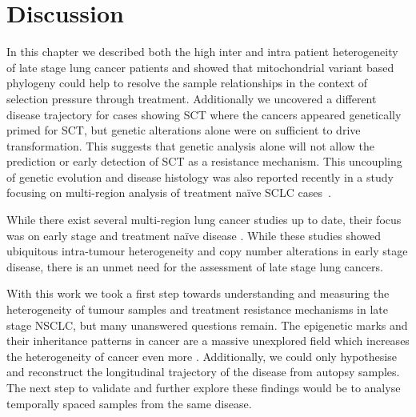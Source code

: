 \section{Discussion}
\label{cascade-sec:outlook}

In this chapter we described both the high inter and intra patient heterogeneity of late stage lung cancer patients and showed that mitochondrial variant based phylogeny could help to resolve the sample relationships in the context of selection pressure through treatment. Additionally we uncovered a different disease trajectory for cases showing SCT where the cancers appeared genetically primed for SCT, but genetic alterations alone were on sufficient to drive transformation. This suggests that genetic analysis alone will not allow the prediction or early detection of SCT as a resistance mechanism. This uncoupling of genetic evolution and disease histology was also reported recently in a study focusing on multi-region analysis of treatment na\"ive SCLC cases~\cite{Zhou2021}.

While there exist several multi-region lung cancer studies up to date, their focus was on early stage and treatment na\"ive disease \cite{JamalHanjani2017,Leong2018}. While these studies showed ubiquitous intra-tumour heterogeneity and copy number alterations in early stage disease, there is an unmet need for the assessment of late stage lung cancers\cite{Zhang2014}. \cite{Network2012,CGARN2014,George2015}

With this work we took a first step towards understanding and measuring the heterogeneity of tumour samples and treatment resistance mechanisms in late stage NSCLC, but many unanswered questions remain. The epigenetic marks and their inheritance patterns in cancer are a massive unexplored field which increases the heterogeneity of cancer even more \cite{Easwaran2014}. Additionally, we could only hypothesise and reconstruct the longitudinal trajectory of the disease from autopsy samples. The next step to validate and further explore these findings would be to analyse temporally spaced samples from the same disease.